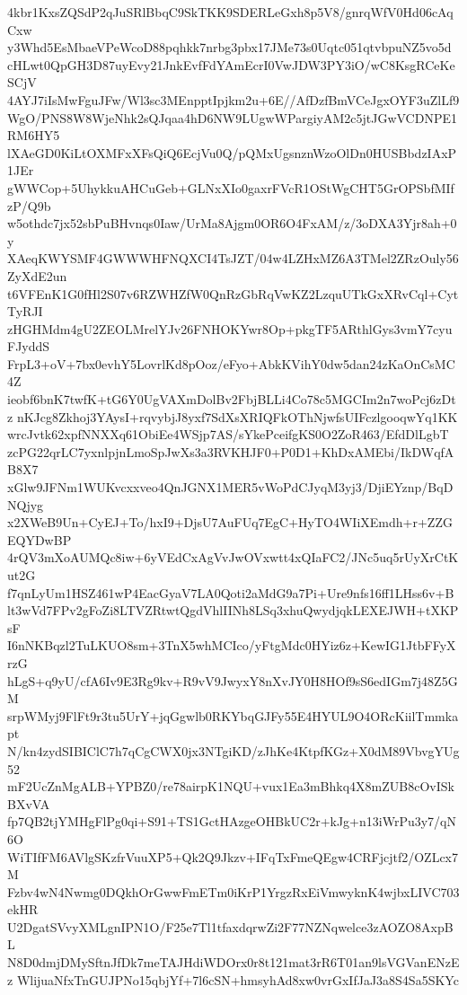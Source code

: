 4kbr1KxsZQSdP2qJuSRlBbqC9SkTKK9SDERLeGxh8p5V8/gnrqWfV0Hd06cAqCxw
y3Whd5EsMbaeVPeWcoD88pqhkk7nrbg3pbx17JMe73s0Uqtc051qtvbpuNZ5vo5d
cHLwt0QpGH3D87uyEvy21JnkEvfFdYAmEcrI0VwJDW3PY3iO/wC8KsgRCeKeSCjV
4AYJ7iIsMwFguJFw/Wl3sc3MEnpptIpjkm2u+6E//AfDzfBmVCeJgxOYF3uZlLf9
WgO/PNS8W8WjeNhk2sQJqaa4hD6NW9LUgwWPargiyAM2c5jtJGwVCDNPE1RM6HY5
lXAeGD0KiLtOXMFxXFsQiQ6EcjVu0Q/pQMxUgsnznWzoOlDn0HUSBbdzIAxP1JEr
gWWCop+5UhykkuAHCuGeb+GLNxXIo0gaxrFVcR1OStWgCHT5GrOPSbfMIfzP/Q9b
w5othdc7jx52sbPuBHvnqs0Iaw/UrMa8Ajgm0OR6O4FxAM/z/3oDXA3Yjr8ah+0y
XAeqKWYSMF4GWWWHFNQXCI4TsJZT/04w4LZHxMZ6A3TMel2ZRzOuly56ZyXdE2un
t6VFEnK1G0fHl2S07v6RZWHZfW0QnRzGbRqVwKZ2LzquUTkGxXRvCql+CytTyRJI
zHGHMdm4gU2ZEOLMrelYJv26FNHOKYwr8Op+pkgTF5ARthlGys3vmY7cyuFJyddS
FrpL3+oV+7bx0evhY5LovrlKd8pOoz/eFyo+AbkKVihY0dw5dan24zKaOnCsMC4Z
ieobf6bnK7twfK+tG6Y0UgVAXmDolBv2FbjBLLi4Co78c5MGCIm2n7woPcj6zDtz
nKJcg8Zkhoj3YAysI+rqvybjJ8yxf7SdXsXRIQFkOThNjwfsUIFczlgooqwYq1KK
wrcJvtk62xpfNNXXq61ObiEe4WSjp7AS/sYkePceifgKS0O2ZoR463/EfdDlLgbT
zcPG22qrLC7yxnlpjnLmoSpJwXs3a3RVKHJF0+P0D1+KhDxAMEbi/IkDWqfAB8X7
xGlw9JFNm1WUKvcxxveo4QnJGNX1MER5vWoPdCJyqM3yj3/DjiEYznp/BqDNQjyg
x2XWeB9Un+CyEJ+To/hxI9+DjsU7AuFUq7EgC+HyTO4WIiXEmdh+r+ZZGEQYDwBP
4rQV3mXoAUMQc8iw+6yVEdCxAgVvJwOVxwtt4xQIaFC2/JNc5uq5rUyXrCtKut2G
f7qnLyUm1HSZ461wP4EacGyaV7LA0Qoti2aMdG9a7Pi+Ure9nfs16ff1LHss6v+B
lt3wVd7FPv2gFoZi8LTVZRtwtQgdVhlIINh8LSq3xhuQwydjqkLEXEJWH+tXKPsF
I6nNKBqzl2TuLKUO8sm+3TnX5whMCIco/yFtgMdc0HYiz6z+KewIG1JtbFFyXrzG
hLgS+q9yU/cfA6Iv9E3Rg9kv+R9vV9JwyxY8nXvJY0H8HOf9sS6edIGm7j48Z5GM
srpWMyj9FlFt9r3tu5UrY+jqGgwlb0RKYbqGJFy55E4HYUL9O4ORcKiilTmmkapt
N/kn4zydSIBIClC7h7qCgCWX0jx3NTgiKD/zJhKe4KtpfKGz+X0dM89VbvgYUg52
mF2UcZnMgALB+YPBZ0/re78airpK1NQU+vux1Ea3mBhkq4X8mZUB8cOvISkBXvVA
fp7QB2tjYMHgFlPg0qi+S91+TS1GctHAzgeOHBkUC2r+kJg+n13iWrPu3y7/qN6O
WiTIfFM6AVlgSKzfrVuuXP5+Qk2Q9Jkzv+IFqTxFmeQEgw4CRFjcjtf2/OZLcx7M
Fzbv4wN4Nwmg0DQkhOrGwwFmETm0iKrP1YrgzRxEiVmwyknK4wjbxLIVC703ekHR
U2DgatSVvyXMLgnIPN1O/F25e7Tl1tfaxdqrwZi2F77NZNqwelce3zAOZO8AxpBL
N8D0dmjDMySftnJfDk7meTAJHdiWDOrx0r8t121mat3rR6T01an9lsVGVanENzEz
WlijuaNfxTnGUJPNo15qbjYf+7l6cSN+hmsyhAd8xw0vrGxIfJaJ3a8S4Sa5SKYc
